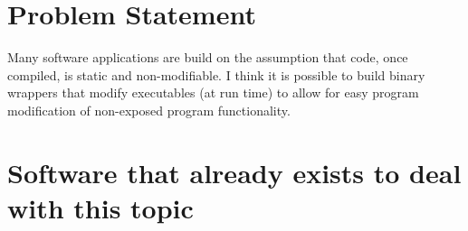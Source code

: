 \maketitle

\section{Problem Statement}

Many software applications are build on the assumption that code, once compiled, is static and non-modifiable. I think it is possible to build binary wrappers that modify executables (at run time) to allow for easy program modification of non-exposed program functionality.   

\section{Software that already exists to deal with this topic}

